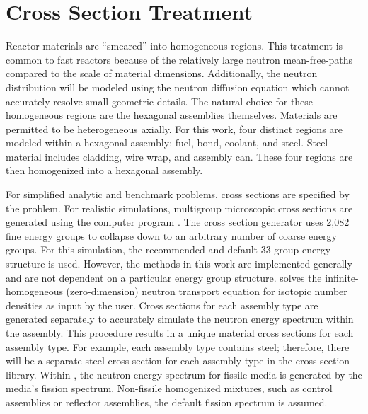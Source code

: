 \section{Cross Section Treatment}
  \label{sec:cross_section_treatment}
  Reactor materials are ``smeared'' into homogeneous regions. This treatment is
  common to fast reactors because of the relatively large neutron
  mean-free-paths compared to the scale of material dimensions. Additionally,
  the neutron distribution will be modeled using the neutron diffusion equation
  which cannot accurately resolve small geometric details. The natural
  choice for these homogeneous regions are the hexagonal assemblies themselves.
  Materials are permitted to be heterogeneous axially. For this work, four
  distinct regions are modeled within a hexagonal assembly: fuel, bond, coolant,
  and steel. Steel material includes cladding, wire wrap, and assembly can. 
  These four regions are then homogenized into a hexagonal assembly.

  For simplified analytic and benchmark problems, cross sections are specified
  by the problem. For realistic simulations, multigroup microscopic cross
  sections are generated using the computer program \mcc \cite{mcc}. The cross
  section generator uses 2,082 fine energy groups to collapse down to an
  arbitrary number of coarse energy groups. For this simulation, the recommended
  and default 33-group energy structure is used. However, the methods in this
  work are implemented generally and are not dependent on a particular energy
  group structure. \mcc solves the infinite-homogeneous (zero-dimension) neutron
  transport equation for isotopic number densities as input by the user.  Cross
  sections for each assembly type are generated separately to accurately
  simulate the neutron energy spectrum within the assembly. This procedure
  results in a unique material cross sections for each assembly type. For
  example, each assembly type contains steel; therefore, there will be a
  separate steel cross section for each assembly type in the cross section
  library. Within \mcc, the neutron energy spectrum for fissile media is
  generated by the media's fission spectrum.  Non-fissile homogenized mixtures,
  such as control assemblies or reflector assemblies, the default
   fission spectrum is assumed.

